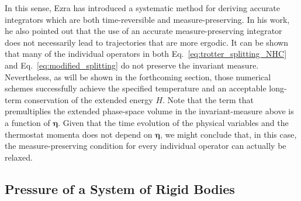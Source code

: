\documentclass[aip,jcp,reprint,amsmath,amssymb,raggedbottom]{revtex4-1}
\newcommand{\vt}[1]{\boldsymbol{\mathbf{#1}}}           %
\begin{document}
In this sense, Ezra \cite{Ezra2006} has introduced a systematic method for deriving accurate integrators which are both time-reversible and measure-preserving. In his work, he also pointed out that the use of an accurate measure-preserving integrator does not necessarily lead to trajectories that are more ergodic. It can be shown that many of the individual operators in both Eq.~\ref{eq:trotter_splitting_NHC} and Eq.~\ref{eq:modified_splitting} do not preserve the invariant measure. Nevertheless, as will be shown in the forthcoming section, those numerical schemes successfully achieve the specified temperature and an acceptable long-term conservation of the extended energy $H$. Note that the term that premultiplies the extended phase-space volume in the invariant-measure above is a function of $\vt \eta$. Given that the time evolution of the physical variables and the thermostat momenta does not depend on $\vt \eta$, we might conclude that, in this case, the measure-preserving condition for every individual operator can actually be relaxed.

\subsection{Pressure of a System of Rigid Bodies}
\label{sec:pressure}
\end{document}
